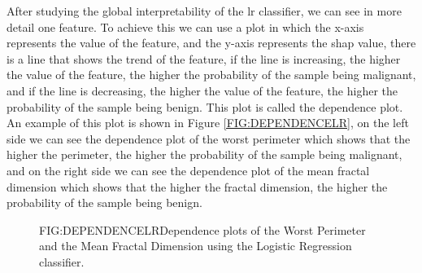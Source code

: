After studying the global interpretability of the \ac{lr} classifier, we can see in more detail one feature. To achieve this we can use a plot in which the x-axis represents the value of the feature, and the y-axis represents the \ac{shap} value, there is a line that shows the trend of the feature, if the line is increasing, the higher the value of the feature, the higher the probability of the sample being malignant, and if the line is decreasing, the higher the value of the feature, the higher the probability of the sample being benign. This plot is called the dependence plot. An example of this plot is shown in Figure \ref{FIG:DEPENDENCELR}, on the left side we can see the dependence plot of the worst perimeter which shows that the higher the perimeter, the higher the probability of the sample being malignant, and on the right side we can see the dependence plot of the mean fractal dimension which shows that the higher the fractal dimension, the higher the probability of the sample being benign.

\begin{figure}[Dependence Plots]{FIG:DEPENDENCELR}{Dependence plots of the Worst Perimeter and the Mean Fractal Dimension using the Logistic Regression classifier.}
\end{figure}
